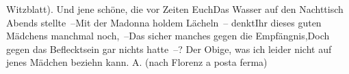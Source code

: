 \begin{ledgroupsized}[t]{13cm}
                  Witzblatt).\pend
           \stanza{}Und jene schöne, die vor Zeiten Euch\newverse{}Das Wasser auf den Nachttisch Abends stellte –\newverse{}Mit der Madonna holdem Lächeln – denkt\newverse{}Ihr dieses guten Mädchens manchmal noch, –\newverse{}Das sicher manches gegen die Empfängnis,\newverse{}Doch gegen das Beflecktsein gar nichts hatte –?\stanzaend{}\pstart
           Der Obige, was ich leider nicht auf jenes Mädchen beziehn kann.\pend
           \pstart
           \spacefill\mbox{A.}\pend
           \pstart
           (nach Florenz a posta ferma)\pend
           
         
         \endnumbering{}\end{ledgroupsized}  \newcommand{\dateiname}{L00374}\newcommand{\titel}{Arthur Schnitzler an Richard Beer-Hofmann, 29. 9. 1894}\newcommand{\editorInnen}{Martin Anton Müller und Gerd-Hermann Susen}
      